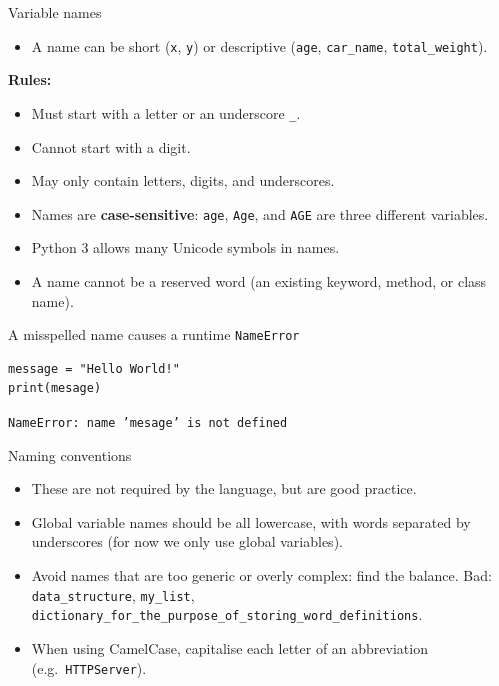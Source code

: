 \documentclass[aspectratio=169,11pt]{beamer}
\begin{document}
\begin{frame}[fragile]{Variable names}
  \begin{itemize}
    \item A name can be short (\texttt{x}, \texttt{y}) or descriptive
          (\texttt{age}, \texttt{car\_name}, \texttt{total\_weight}).
  \end{itemize}
  \textbf{Rules:}
  \begin{itemize}
    \item Must start with a letter or an underscore \texttt{\_}.
    \item Cannot start with a digit.
    \item May only contain letters, digits, and underscores.
    \item Names are \textbf{case-sensitive}: \texttt{age}, \texttt{Age}, and
          \texttt{AGE} are three different variables.
    \item Python 3 allows many Unicode symbols in names.
    \item A name cannot be a reserved word (an existing keyword, method, or
          class name).
  \end{itemize}
  \begin{block}{A misspelled name causes a runtime \texttt{NameError}}
\begin{verbatim}
message = "Hello World!"
print(mesage)
\end{verbatim}
    \texttt{NameError: name 'mesage' is not defined}
  \end{block}
\end{frame}

\begin{frame}{Naming conventions}
  \begin{itemize}
    \item These are not required by the language, but are good practice.
    \item Global variable names should be all lowercase, with words separated
          by underscores (for now we only use global variables).
    \item Avoid names that are too generic or overly complex: find the
          balance. Bad: \texttt{data\_structure}, \texttt{my\_list},
          \texttt{dictionary\_for\_the\_purpose\_of\_storing\_word\_definitions}.
    \item When using CamelCase, capitalise each letter of an abbreviation
          (e.g.\ \texttt{HTTPServer}).
  \end{itemize}
\end{frame}
\end{document}
